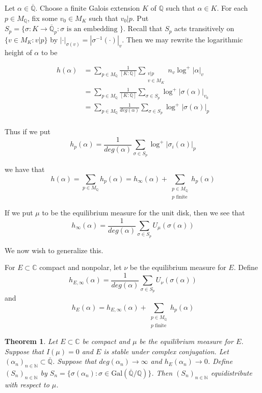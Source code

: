 \documentclass{amsart}
\newtheorem{thm}{Theorem}[section]
\newcommand{\sbs}{\subset}
\newcommand{\N}{\mathbb{N}}
\newcommand{\C}{\mathbb{C}}
\newcommand{\Q}{\mathbb{Q}}
\newcommand{\ol}{\overline}
\begin{document}
Let $\alpha \in \ol{\Q}$. Choose a finite Galois extension $K$ of $\Q$ such that $\alpha \in K$. For each $p \in M_{\Q}$, fix some $v_0 \in M_K$ such that $v_0|p$. Put $S_p = \{\sigma :K \rightarrow \ol{\Q}_p: \sigma \text{ is an embedding }\}$. Recall that $S_p$ acts transitively on $\{v \in M_K: v|p\}$ by $|\cdot|_{\sigma(v)} = |\sigma^{-1}( \cdot)|_v$. Then we may rewrite the logarithmic height of $\alpha$ to be 

\begin{align*}
h(\alpha)
&= \sum_{p \in M_{\Q}} \frac{1}{[K:\Q]} \sum_{\substack{v|p\\v \in M_K}}n_v \log^+|\alpha|_v\\
&= \sum_{p \in M_{\Q}} \frac{1}{[K:\Q]} \sum_{\sigma \in S_p} \log^+ |\sigma(\alpha)|_{v_0}\\
&= \sum_{p \in M_{\Q}} \frac{1}{deg(\alpha)}\sum_{\sigma \in S_p} \log^+ |\sigma(\alpha)|_{p}\\
\end{align*}

Thus if we put $$h_p(\alpha) = \frac{1}{deg(\alpha)}\sum_{\sigma \in S_p} \log^+ |\sigma_i(\alpha)|_{p}$$ 

we have that $$h(\alpha) = \sum_{p \in M_{\Q}} h_p(\alpha) = h_{\infty}(\alpha) + \sum_{\substack{p \in M_{\Q}\\ p \text{ finite}}} h_p(\alpha)$$

If we put $\mu$ to be the equilibrium measure for the unit disk, then we see that $$h_{\infty}(\alpha) = \frac{1}{deg(\alpha)} \sum_{\sigma \in S_p} U_{\mu}(\sigma(\alpha))$$

We now wish to generalize this.

For $E \sbs \C$ compact and nonpolar, let $\nu$ be the equilibrium measure for $E$. Define $$h_{E,\infty}(\alpha) = \frac{1}{deg(\alpha)} \sum_{\sigma \in S_p} U_{\nu}(\sigma(\alpha))$$ and $$h_E(\alpha) = h_{E,\infty}(\alpha) + \sum_{\substack{p \in M_{\Q}\\ p \text{ finite}}} h_p(\alpha)$$

\begin{thm}

Let $E \sbs \C $ be compact and $\mu$ be the equilibrium measure for $E$. Suppose that $I(\mu) = 0$ and $E$ is stable under complex conjugation. Let $(\alpha_n)_{n \in \N} \sbs \ol{\Q}$. Suppose that $deg(\alpha_n) \rightarrow \infty$ and $h_E(\alpha_n) \rightarrow 0$. Define $(S_n)_{n \in \N}$ by $S_n = \{\sigma(\alpha_n): \sigma \in \mathrm{Gal}(\ol{ \Q }/ \Q )\}$. Then $(S_n)_{n \in \N}$ equidistribute with respect to $\mu$. 

\end{thm}
\end{document}
